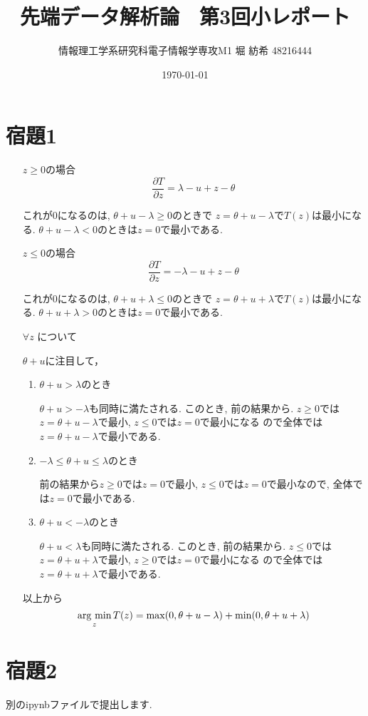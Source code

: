 \documentclass[a4paper,11pt]{jsarticle}
\newcommand{\argmin}{\mathop{\rm arg~min}\limits}
\begin{document}
  \title{先端データ解析論　第3回小レポート}
  \author{情報理工学系研究科電子情報学専攻M1 堀 紡希 48216444}
  \date{\today}
  \maketitle

  \section*{宿題1}
  \begin{itemize}
    \item[$z\geq0$の場合]
  \[\frac{\partial T}{\partial z} = \lambda - u + z - \theta\]

  これが$0$になるのは, $\theta + u - \lambda \geq 0$のときで
  $z = \theta + u - \lambda$で$T(z)$は最小になる.
  $\theta + u - \lambda < 0$のときは$z=0$で最小である.

    \item[$z\leq0$の場合]
  \[\frac{\partial T}{\partial z} = -\lambda - u + z - \theta\]

  これが$0$になるのは, $\theta + u + \lambda \leq 0$のときで
  $z = \theta + u + \lambda$で$T(z)$は最小になる.
  $\theta + u + \lambda > 0$のときは$z=0$で最小である.
  
  \item[$\forall z$]
  について

  $\theta + u$に注目して，
  
  \begin{enumerate}
    \item $\theta + u > \lambda$のとき
      
      $\theta + u > -\lambda$も同時に満たされる. このとき, 前の結果から. $z\geq 0$では$z = \theta + u -\lambda$で最小, $z\leq 0$では$z=0$で最小になる
      ので全体では$z = \theta + u - \lambda$で最小である.

    \item $-\lambda \leq \theta + u \leq \lambda$のとき
    
      前の結果から$z\geq 0$では$z=0$で最小, $z\leq 0$では$z=0$で最小なので, 全体では$z=0$で最小である.

    \item $\theta + u < -\lambda$のとき
      
      $\theta + u < \lambda$も同時に満たされる. このとき, 前の結果から. $z\leq 0$では$z = \theta + u + \lambda$で最小, $z\geq 0$では$z=0$で最小になる
      ので全体では$z = \theta + u + \lambda$で最小である.
  \end{enumerate}
  以上から
  \[\argmin _{z} T(z) = \max (0, \theta + u - \lambda ) + \min (0, \theta + u + \lambda) \]
  \end{itemize}
  \section*{宿題2}
  別のipynbファイルで提出します.
\end{document}
